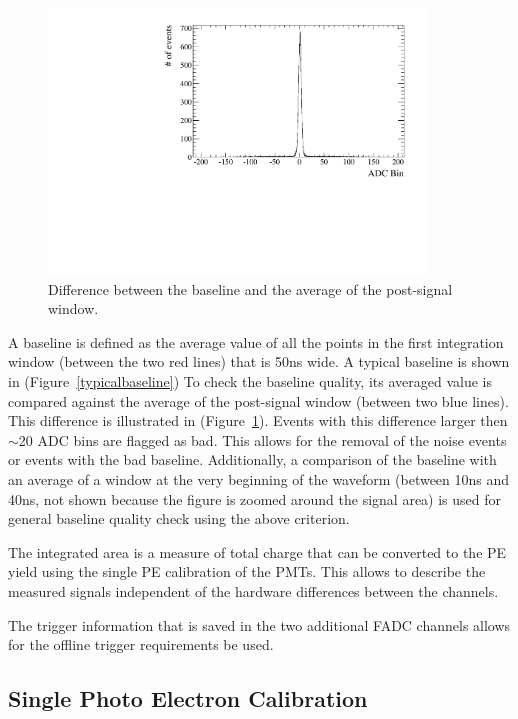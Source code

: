 \documentclass[preprint,12pt]{elsarticle}
\begin{document}
\begin{figure}[ht]
\centering
\includegraphics[width=100mm]{baselinedifference.pdf}
\caption{Difference between the baseline and the average of the post-signal window.} \label{baselinedifference}
\end{figure}


A baseline is defined as the average value of all the points in the first integration window (between the two red lines) that is 50ns wide. A typical baseline is shown in (Figure~\ref{typicalbaseline}) To check the baseline quality, its averaged value is compared against the average of the post-signal window (between two blue lines). This difference is illustrated in (Figure~\ref{baselinedifference}). Events with this difference larger then $\sim$20 ADC bins are flagged as bad. This allows for the removal of the noise events or events with the bad baseline. Additionally, a comparison of the baseline with an average of a window at the very beginning of the waveform (between 10ns and 40ns, not shown because the figure is zoomed around the signal area) is used for general baseline quality check using the above criterion.


The integrated area is a measure of total charge that can be converted to the PE yield using the single PE calibration of the PMTs. This allows to describe the measured signals independent of the hardware differences between the channels.

The trigger information that is saved in the two additional FADC channels allows for the offline trigger requirements be used.

\subsection{Single Photo Electron Calibration}
\end{document}
